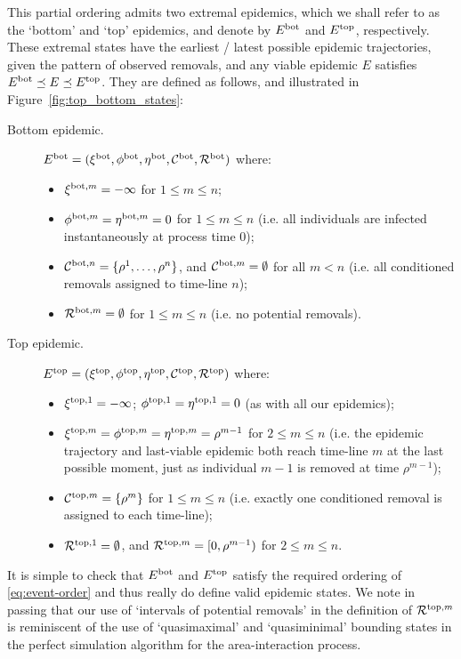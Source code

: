 \documentclass[]{article}
\newcommand{\Conditioned}{\mathcal{C}}
\newcommand{\Epidemic}{E}%
\newcommand{\Removals}{\mathcal{R}}
\newcommand{\ple}{\preceq}
\newcommand{\Bot}[1][]{{}^{\textup{bot}#1}}
\newcommand{\Top}[1][]{{}^{\textup{top}#1}}
\begin{document}
This partial ordering admits two extremal epidemics, which we shall refer to as the `bottom' and `top' epidemics, and denote by \(\Epidemic\Bot\) and \(\Epidemic\Top\), respectively. These extremal states have the earliest / latest possible epidemic trajectories, given the pattern of observed removals, and any viable epidemic \(\Epidemic\) satisfies \(\Epidemic\Bot \ple \Epidemic \ple \Epidemic\Top\). They are defined as follows, and illustrated in Figure~\ref{fig:top_bottom_states}:
\begin{description}
	\item[Bottom epidemic.] \( \Epidemic\Bot=(\xi\Bot, \phi\Bot, \eta\Bot, \Conditioned\Bot, \Removals\Bot) \)
where: 
\begin{itemize}
	\item \(\xi\Bot[,m] = -\infty\) for \(1\le m \le n\);
	\item \(\phi\Bot[,m] = \eta\Bot[,m] = 0\) for \(1\le m\le n\) (i.e. all individuals are infected instantaneously at process time 0);
	\item \(\Conditioned\Bot[,n] = \{\rho^1,\dots,\rho^n\}\), and \(\Conditioned\Bot[,m] = \emptyset\) for all \(m<n\) (i.e. all conditioned removals assigned to time-line \(n\));
	\item \(\Removals\Bot[,m] = \emptyset\) for \(1\le m\le n\) (i.e. no potential removals).
\end{itemize}	
	\item[Top epidemic.] \( \Epidemic\Top=(\xi\Top, \phi\Top, \eta\Top, \Conditioned\Top, \Removals\Top) \)
	where: 
\begin{itemize}
	\item \(\xi\Top[,1] = -\infty\); \(\phi\Top[,1] = \eta\Top[,1] = 0\) (as with all our epidemics);
	\item \(\xi\Top[,m] = \phi\Top[,m] = \eta\Top[,m] = \rho^{m-1}\) for \(2\le m \le n\) (i.e. the epidemic trajectory and last-viable epidemic both reach time-line \(m\) at the last possible moment, just as individual \(m-1\) is removed at time \(\rho^{m-1}\));
	\item \(\Conditioned\Top[,m] = \{\rho^m\}\) for \(1\le m\le n\) (i.e. exactly one conditioned removal is assigned to each time-line);
	\item \(\Removals\Top[,1] = \emptyset\), and \(\Removals\Top[,m] = [0,\rho^{m-1})\) for \(2\le m\le n\).
\end{itemize}
\end{description}
It is simple to check that \(\Epidemic\Bot\) and \(\Epidemic\Top\) satisfy the required ordering of \eqref{eq:event-order} and thus really do define valid epidemic states. We note in passing that our use of `intervals of potential removals' in the definition of \(\Removals\Top[,m]\)
is reminiscent of the use of `quasimaximal' and `quasiminimal' bounding states 
in the \cite{HaggstromLieshoutMoeller-1999}
perfect simulation algorithm for the area-interaction process.
\end{document}
